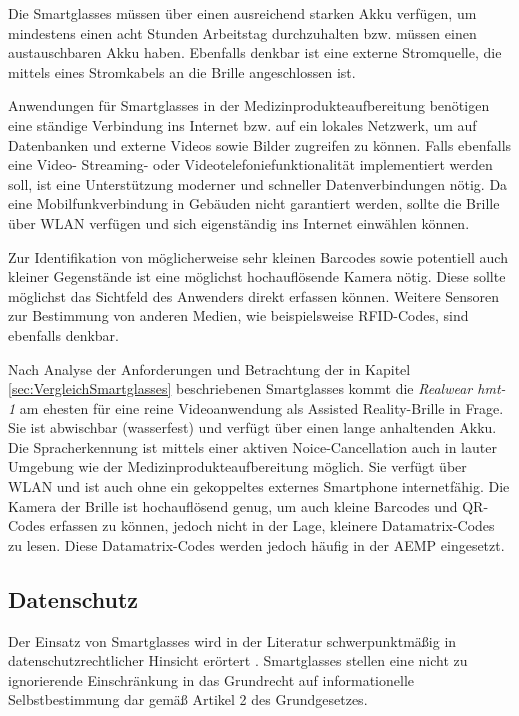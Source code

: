 Die Smartglasses müssen über einen ausreichend starken Akku verfügen, um mindestens einen acht Stunden Arbeitstag durchzuhalten bzw. müssen einen austauschbaren Akku haben. Ebenfalls denkbar ist eine externe Stromquelle, die mittels eines Stromkabels an die Brille angeschlossen ist.

Anwendungen für Smartglasses in der Medizinprodukteaufbereitung benötigen eine ständige Verbindung ins Internet bzw. auf ein lokales Netzwerk, um auf Datenbanken und externe Videos sowie Bilder zugreifen zu können. Falls ebenfalls eine Video- Streaming- oder Videotelefoniefunktionalität implementiert werden soll, ist eine Unterstützung moderner und schneller Datenverbindungen nötig. Da eine Mobilfunkverbindung in Gebäuden nicht garantiert werden, sollte die Brille über WLAN verfügen und sich eigenständig ins Internet einwählen können.

Zur Identifikation von möglicherweise sehr kleinen Barcodes sowie potentiell auch kleiner Gegenstände ist eine möglichst hochauflösende Kamera nötig. Diese sollte möglichst das Sichtfeld des Anwenders direkt erfassen können. Weitere Sensoren zur Bestimmung von anderen Medien, wie beispielsweise RFID-Codes, sind ebenfalls denkbar.
%
%

Nach Analyse der Anforderungen und Betrachtung der in Kapitel \ref{sec:VergleichSmartglasses} beschriebenen Smartglasses kommt die \emph{Realwear hmt-1} am ehesten für eine reine Videoanwendung als Assisted Reality-Brille in Frage. Sie ist abwischbar (wasserfest) und verfügt über einen lange anhaltenden Akku. Die Spracherkennung ist mittels einer aktiven Noice-Cancellation auch in lauter Umgebung wie der Medizinprodukteaufbereitung möglich. Sie verfügt über WLAN und ist auch ohne ein gekoppeltes externes Smartphone internetfähig. Die Kamera der Brille ist hochauflösend genug, um auch kleine Barcodes und QR-Codes erfassen zu können, jedoch nicht in der Lage, kleinere Datamatrix-Codes zu lesen. Diese Datamatrix-Codes werden jedoch häufig in der AEMP eingesetzt.
%
%
%
%
%
%
\subsection{Datenschutz}
\label{sec:Datenschutz}
Der Einsatz von Smartglasses wird in der Literatur schwerpunktmäßig in datenschutzrechtlicher Hinsicht erörtert \cite{Berkemeier2017}. Smartglasses stellen eine nicht zu ignorierende Einschränkung in das Grundrecht auf informationelle Selbstbestimmung dar gemäß Artikel 2 des Grundgesetzes.

